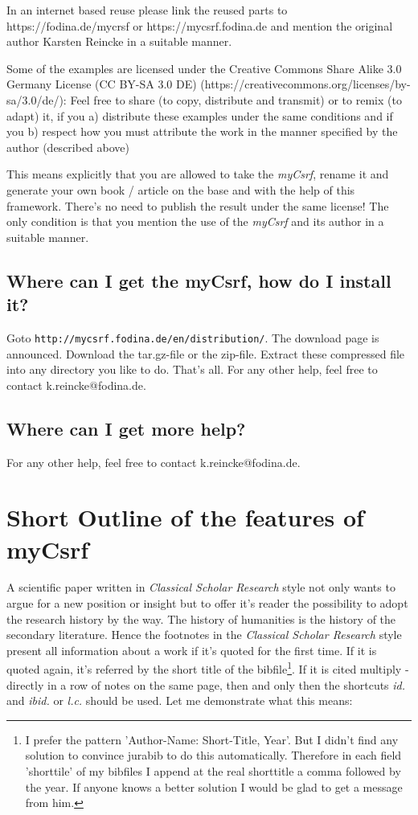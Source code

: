 \documentclass[
  DIV=calc,
  BCOR=5mm,
  11pt,
  headings=small,
  oneside,
  abstract=true,
  toc=bib,
  ngerman,english]{scrartcl}
\begin{document}
In an internet based reuse please link the reused parts to https://fodina.de/mycrsf
or https://mycsrf.fodina.de and mention the original author Karsten Reincke in a
suitable manner.

Some of the examples are licensed under the Creative Commons Share Alike 3.0 Germany
License (CC BY-SA 3.0 DE) (https://creativecommons.org/licenses/by-sa/3.0/de/):
Feel free to share (to copy, distribute and transmit) or to remix (to adapt) it, if you
a) distribute these examples under the same conditions and if you b) respect how you
must attribute the work in the manner specified by the author (described above)

This means explicitly that you are allowed to take the
\textit{myCsrf}, rename it and generate your own book / article on
the base and with the help of this framework. There's no need to publish the
result under the same license! The only condition is that you mention the use of
the \textit{myCsrf} and its author in a suitable manner.

\subsection{Where can I get the myCsrf, how do I install it?}

Goto \texttt{http://mycsrf.fodina.de/en/distribution/}. The download page
is announced. Download the tar.gz-file or the zip-file. Extract these compressed
file into any directory you like to do. That's all. For any other help, feel
free to contact k.reincke@fodina.de.

\subsection{Where can I get more help?}

For any other help, feel free to contact k.reincke@fodina.de.


\section{Short Outline of the features of myCsrf}

A scientific paper written in \textit{Classical Scholar Research} style not only
wants to argue for a new position or insight but to offer it's reader
the possibility to adopt the research history by the way. The history of
humanities is the history of the secondary literature. Hence the footnotes in
the \textit{Classical Scholar Research} style present all information about a work
if it's quoted for the first time. If it is quoted again, it's referred by the
short title of the bibfile\footnote{I prefer the pattern 'Author-Name:
Short-Title, Year'. But I didn't find any solution to convince jurabib to do
this automatically. Therefore in each field 'shorttile' of my bibfiles I append
at the real shorttitle a comma followed by the year. If anyone knows a better
solution I would be glad to get a message from him.}. If it is cited multiply -
directly in a row of notes on the same page, then and only then the shortcuts \textit{id.}
and \textit{ibid.} or \textit{l.c.} should be used. Let me demonstrate what
this means:
\end{document}
